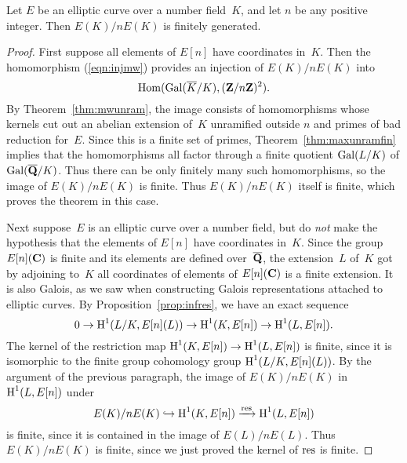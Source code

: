 \begin{theorem}
Let $E$ be an elliptic curve over a number field~$K$, and
let $n$ be any positive integer.  Then 
$E(K)/nE(K)$ is finitely generated.
\end{theorem}
\begin{proof}
  First suppose all elements of $E[n]$ have coordinates in~$K$.  Then
  the homomorphism (\ref{eqn:injmw}) provides an injection of $E(K)/n
  E(K)$ into $$\operatorname{Hom}(\operatorname{Gal}(\overline{K}/K), (\mathbf{Z}/n\mathbf{Z})^2).$$ By
  Theorem~\ref{thm:mwunram}, the image consists of homomorphisms whose
  kernels cut out an abelian extension of~$K$ unramified outside $n$
  and primes of bad reduction for~$E$.  Since this is a finite set of
  primes, Theorem~\ref{thm:maxunramfin} implies that the homomorphisms
  all factor through a finite quotient $\operatorname{Gal}(L/K)$ of $\operatorname{Gal}(\overline{\mathbf{Q}}/K)$.
  Thus there can be only finitely many such homomorphisms, so the
  image of $E(K)/nE(K)$ is finite.  Thus $E(K)/nE(K)$ itself is
  finite, which proves the theorem in this case.

Next suppose~$E$ is an elliptic curve over a number field, but do {\em
  not} make the hypothesis that the elements of $E[n]$ have
coordinates in~$K$.  Since the group $E[n](\mathbf{C})$ is finite and its
elements are defined over~$\overline{\mathbf{Q}}$, the extension~$L$ of~$K$ got by
adjoining to~$K$ all coordinates of elements of $E[n](\mathbf{C})$ is a finite
extension.  It is also Galois, as we saw when constructing Galois
representations attached to elliptic curves.  By Proposition~\ref{prop:infres},
we have an exact sequence
$$
   0 \to \operatorname{H}^1(L/K, E[n](L))\to   \operatorname{H}^1(K,E[n])\to \operatorname{H}^1(L,E[n]).
$$
The kernel of the restriction map 
$\operatorname{H}^1(K,E[n])\to \operatorname{H}^1(L,E[n])$ is finite, since it is
isomorphic to the finite group cohomology group 
$\operatorname{H}^1(L/K, E[n](L))$.  By the argument of the previous
paragraph, the image of $E(K)/nE(K)$ in $\operatorname{H}^1(L,E[n])$
under
$$
  E(K)/n E(K) \hookrightarrow \operatorname{H}^1(K,E[n]) \xrightarrow{\operatorname{res}} \operatorname{H}^1(L,E[n])
$$
is finite, since it is contained in the image of $E(L)/n E(L)$.
Thus $E(K)/n E(K)$ is finite, since we just proved
the kernel of $\operatorname{res}$ is finite.
\end{proof}



